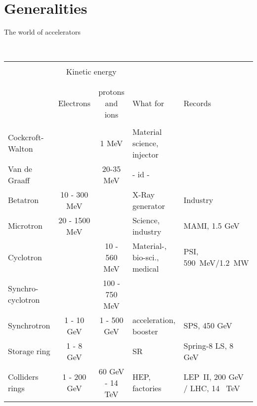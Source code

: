 \documentclass[12pt]{article}
\begin{document}
\clearpage

~

\vspace{-100mm}

\begin{table}[t]
\section*{\LARGE Generalities }

\begin{center}
\bf
\large

{\huge The world of accelerators }

~

\begin{tabular}{|l|c||c|l|l|}
\hline
\\
                    &  \multicolumn{2}{|c|}{Kinetic energy } &  \multicolumn{2}{|c|}{ } \\
\\
\hline
 & & & & \\
                                &  Electrons         &  protons and ions & What for                       &  Records \\
 & & & & \\[1ex]
\hline
Cockcroft-Walton&                    &      1 MeV      & Material science, injector &\\[.6ex]
Van de Graaff   &                    &      20-35 MeV  &  - id -                    & \\[.6ex]
Betatron                        &    10 - 300 MeV    &                 & X-Ray generator            &  Industry \\[.6ex]
Microtron                       &  20 - 1500 MeV     &                 & Science, industry          &  MAMI, 1.5 GeV\\[.6ex]
Cyclotron                       &                    & 10 - 560 MeV    & Material-, bio-sci., medical     & PSI, 590~MeV/1.2~MW\\[.6ex]
Synchro-cyclotron               &                    & 100 - 750 MeV   &                            &  \\[.6ex]
Synchrotron                     &    1 - 10 GeV      & 1 - 500 GeV     &  acceleration, booster     &  SPS, 450 GeV \\[.6ex]
Storage ring                    &   1 - 8 GeV        &                 &  SR                        & Spring-8 LS, 8 GeV \\[.6ex]
Colliders rings                 &  1 - 200 GeV       & 60 GeV - 14 TeV &  HEP, factories  & LEP~II, 200 GeV / LHC, 14~ TeV \\[.6ex]

\end{tabular}
\end{center}
\end{table}
\end{document}
